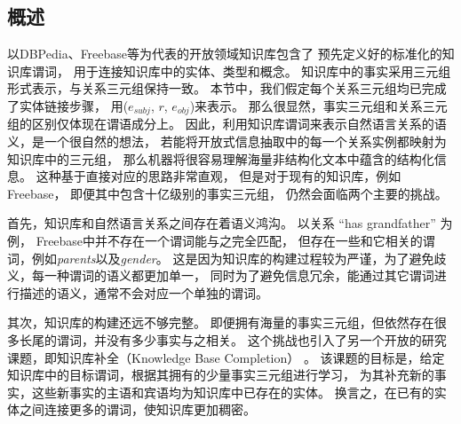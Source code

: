 
\subsection{概述}
\label{sec:schema-intro}


以DBPedia、Freebase等为代表的开放领域知识库包含了
预先定义好的标准化的知识库谓词，
用于连接知识库中的实体、类型和概念。
知识库中的事实采用三元组形式表示，与关系三元组保持一致。
本节中，我们假定每个关系三元组均已完成了实体链接步骤，
用($e_{subj}$, $r$, $e_{obj}$)来表示。
那么很显然，事实三元组和关系三元组的区别仅体现在谓语成分上。
因此，利用知识库谓词来表示自然语言关系的语义，是一个很自然的想法，
若能将开放式信息抽取中的每一个关系实例都映射为知识库中的三元组，
那么机器将很容易理解海量非结构化文本中蕴含的结构化信息。
这种基于直接对应的思路非常直观，
但是对于现有的知识库，例如Freebase\cite{bollacker2008freebase}，
即便其中包含十亿级别的事实三元组，
仍然会面临两个主要的挑战。

首先，知识库和自然语言关系之间存在着语义鸿沟。
以关系 ``has grandfather'' 为例，
Freebase中并不存在一个谓词能与之完全匹配，
但存在一些和它相关的谓词，例如\textit{parents}以及\textit{gender}。
这是因为知识库的构建过程较为严谨，为了避免歧义，每一种谓词的语义都更加单一，
同时为了避免信息冗余，能通过其它谓词进行描述的语义，通常不会对应一个单独的谓词。

其次，知识库的构建还远不够完整。
即便拥有海量的事实三元组，但依然存在很多长尾的谓词，并没有多少事实与之相关。
这个挑战也引入了另一个开放的研究课题，即知识库补全（Knowledge Base Completion）
\cite{gardner2015efficient,lao2010relational,lao2011random}。
该课题的目标是，给定知识库中的目标谓词，根据其拥有的少量事实三元组进行学习，
为其补充新的事实，这些新事实的主语和宾语均为知识库中已存在的实体。
换言之，在已有的实体之间连接更多的谓词，使知识库更加稠密。

